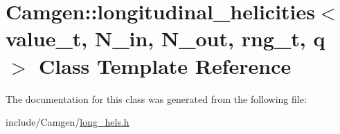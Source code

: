 \hypertarget{a00327}{\section{Camgen\-:\-:longitudinal\-\_\-helicities$<$ value\-\_\-t, N\-\_\-in, N\-\_\-out, rng\-\_\-t, q $>$ Class Template Reference}
\label{a00327}
}


The documentation for this class was generated from the following file\-:\begin{DoxyCompactItemize}
\item 
include/\-Camgen/\hyperlink{a00662}{long\-\_\-hels.\-h}\end{DoxyCompactItemize}
